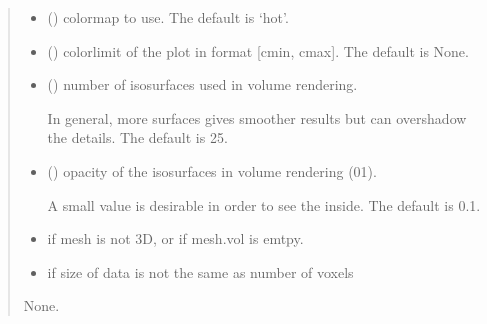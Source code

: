 \documentclass[letterpaper,10pt,english]{sphinxmanual}
\begin{document}
\begin{fulllineitems}
\begin{quote}
\begin{description}
\begin{itemize}
\item {} 
\sphinxAtStartPar
{} (\sphinxstyleliteralemphasis{\sphinxupquote{, }}) \textendash{} colormap to use. The default is ‘hot’.

\item {} 
\sphinxAtStartPar
{} (\sphinxstyleliteralemphasis{\sphinxupquote{, }}) \textendash{} colorlimit of the plot in format {[}cmin, cmax{]}. The default is None.

\item {} 
\sphinxAtStartPar
{} (\sphinxstyleliteralemphasis{\sphinxupquote{, }}) \textendash{} 
\sphinxAtStartPar
number of isosurfaces used in volume rendering.

\sphinxAtStartPar
In general, more surfaces gives smoother results but can overshadow the details.
The default is 25.


\item {} 
\sphinxAtStartPar
{} (\sphinxstyleliteralemphasis{\sphinxupquote{, }}) \textendash{} 
\sphinxAtStartPar
opacity of the isosurfaces in volume rendering (0\sphinxhyphen{}1).

\sphinxAtStartPar
A small value is desirable in order to see the inside. The default is 0.1.


\end{itemize}

\begin{itemize}
\item {} 
\sphinxAtStartPar
{} \textendash{} if mesh is not 3D, or if mesh.vol is emtpy.

\item {} 
\sphinxAtStartPar
{} \textendash{} if size of data is not the same as number of voxels

\end{itemize}

\sphinxAtStartPar
None.


\end{description}
\end{quote}
\end{fulllineitems}
\end{document}
